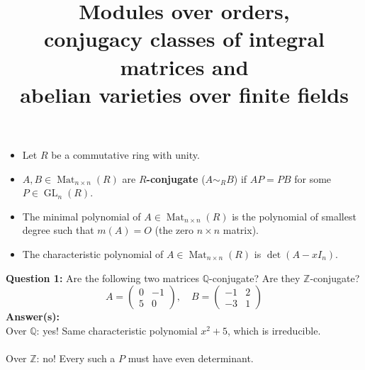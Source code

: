 \documentclass[usenames,dvipsnames]{beamer}
\title[ANTS XVI - MIT]{Modules over orders,\\conjugacy classes of integral matrices and\\ abelian varieties over finite fields}
\subtitle{}
\author[Stefano Marseglia]{}
\date[July 18 2024]{}
\def\Q{\mathbb{Q}}
\def\Z{\mathbb{Z}}
\DeclareMathOperator{\Mat}{Mat}
\DeclareMathOperator{\GL}{GL}
\begin{document}
\begin{frame}{}
   \maketitle
\end{frame}


\begin{frame}{}
   \begin{itemize}
      \item Let $R$ be a commutative ring with unity.
      \item $A,B \in \Mat_{n\times n}(R)$ are {\bf $R$-conjugate} ($A\sim_R B$) if $AP=PB$ for some $P\in \GL_n(R)$.
      \item The minimal polynomial of $A \in \Mat_{n\times n}(R)$ is the polynomial of smallest degree such that $m(A) = O$ (the zero $n\times n$ matrix).
      \item The characteristic polynomial of $A \in \Mat_{n\times n}(R)$ is $\det(A-xI_n)$.
   \end{itemize}
   {\bf Question 1:} 
   \pause Are the following two matrices $\Q$-conjugate? Are they $\Z$-conjugate?
   \[
   A=\begin{pmatrix}
      0 & -1 \\ 5 & 0
   \end{pmatrix}, \quad
   B=\begin{pmatrix}
      -1 & 2 \\ -3 & 1
   \end{pmatrix}
   \]
   \pause
   {\bf Answer(s):}\\ 
   \pause Over $\Q$: yes! Same characteristic polynomial $x^2+5$, which is irreducible.\\
   \\    
   \pause Over $\Z$: no! Every such a $P$ must have even determinant.
\end{frame}
\end{document}
